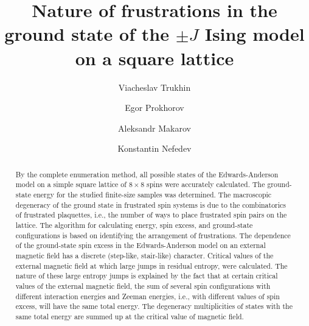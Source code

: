 \documentclass[preprint,12pt]{elsarticle}
\begin{document}
\begin{frontmatter}


\title{Nature of frustrations in the ground state of the $\pm J$ Ising model on a square lattice}

\author[mainaddress, secondaryaddress]{Viacheslav Trukhin}

\author[mainaddress]{Egor Prokhorov}

\author[mainaddress, secondaryaddress]{Aleksandr Makarov}

\author[mainaddress, secondaryaddress]{Konstantin Nefedev}


\address[mainaddress]{Far Eastern Federal University, Vladivostok, Russky Island, 10 Ajax Bay, 690922, the Russian Federation}
\address[secondaryaddress]{Institute of Applied Mathematics, Far Eastern Branch, Russian Academy of Science, Vladivostok, Radio 7, 690041, the Russian Federation}

\begin{abstract}

By the complete enumeration method, all possible states of the Edwards-Anderson model on a simple square lattice of $8 \times 8$ spins were accurately calculated. The ground-state energy for the studied finite-size samples was determined. The macroscopic degeneracy of the ground state in frustrated spin systems is due to the combinatorics of frustrated plaquettes, i.e., the number of ways to place frustrated spin pairs on the lattice. The algorithm for calculating energy, spin excess, and ground-state configurations is based on identifying the arrangement of frustrations. The dependence of the ground-state spin excess in the Edwards-Anderson model on an external magnetic field has a discrete (step-like, stair-like) character. Critical values of the external magnetic field at which large jumps in residual entropy, were calculated. The nature of these large entropy jumps is explained by the fact that at certain critical values of the external magnetic field, the sum of several spin configurations with different interaction energies and Zeeman energies, i.e., with different values of spin excess, will have the same total energy. The degeneracy multiplicities of states with the same total energy are summed up at the critical value of magnetic field.

\end{abstract}


\end{frontmatter}
\end{document}
